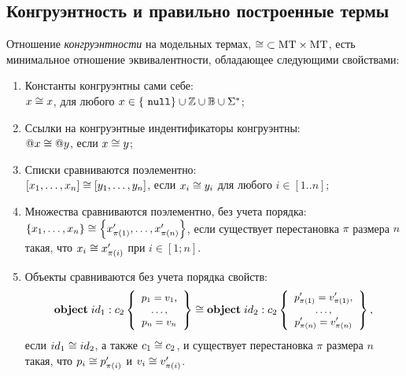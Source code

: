 \subsection{Конгруэнтность и правильно построенные термы}

\begin{Def}[Конгруэнтность]
Отношение \emph{конгруэнтности} на модельных термах, \mbox{$\cong \;\subset \mbox{MT} \times \mbox{MT}$}, есть минимальное отношение эквивалентности, обладающее следующими свойствами:
\begin{enumerate}
\item Константы конгруэнтны сами себе:\\
 \mbox{$x \cong x$}, для любого $x \in \left\{\ \mathtt{null} \right\} \cup \mathbb{Z} \cup \mathbb{B} \cup \Sigma^*$;
\item Ссылки на конгруэнтные индентификаторы конгруэнтны: \\
$@x \cong @y$, если $x \cong y$;
\item Списки сравниваются поэлементно: \\
$\left[x_1, \ldots, x_n\right] \cong \left[y_1, \ldots, y_n\right]$, если $x_i \cong y_i$ для любого $i \in [1..n]$;
\item Множества сравниваются поэлементно, без учета порядка:\\
 $\left\{x_1, \ldots, x_n\right\} \cong \left\{x'_{\pi(1)}, \ldots, x'_{\pi(n)}\right\}$, если существует перестановка $\pi$ размера $n$ такая, что \mbox{$x_i \cong x'_{\pi(i)}$} при \mbox{$i \in [1;n]$}.
\item Объекты сравниваются без учета порядка свойств:
$$ 
\mathbf{object}\;id_1 : c_2\left\{ 
	\mbox{\small$\begin{array}{c}
		p_1=v_1,\\ 
		\ldots,\\ 
		p_n=v_n
	\end{array}$}
 \right\} \cong \mathbf{object}\;id_2 : c_2\left\{ 
	\mbox{\small$\begin{array}{c}
		p'_{\pi(1)}=v'_{\pi(1)},\\
		\ldots,\\
		p'_{\pi(n)}=v'_{\pi(n)}	
	\end{array}$}
 \right\},
$$
если $id_1 \cong id_2$, а также $c_1 \cong c_2$, и существует перестановка $\pi$ размера $n$ такая, что $p_i \cong p'_{\pi(i)}$ и $v_i \cong v'_{\pi(i)}$.
\end{enumerate}
\end{Def}

